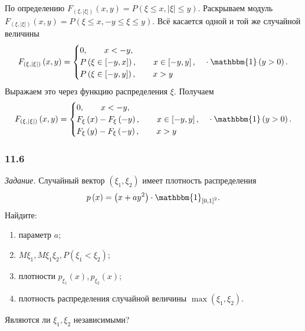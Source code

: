 По определению $F_{ \left( \xi, \left| \xi \right| \right) } \left( x, y \right) = P \left( \xi \leq x, \left| \xi \right| \leq y \right).$
Раскрываем модуль $F_{ \left( \xi, \left| \xi \right| \right) } \left( x, y \right) = P \left( \xi \leq x, -y \leq \xi \leq y \right) $.
Всё касается одной и той же случайной величины
$$F_{ \left( \xi, \left| \xi \right| \right) } \left( x, y \right) =
\begin{cases}
0, \qquad x < - y, \\
P \left( \xi \in \left[ -y, x \right] \right), \qquad x \in \left[ -y, y \right], \\
P \left( \xi \in \left[ -y, y \right] \right), \qquad x > y
\end{cases}
\cdot \mathbbm{1} \left( y > 0 \right).$$
Выражаем это через функцию распределения $ \xi $.
Получаем
$$F_{ \left( \xi, \left| \xi \right| \right) } \left( x, y \right) =
\begin{cases}
0, \qquad x < - y, \\
F_{ \xi } \left( x \right) - F_{ \xi } \left( -y \right), \qquad x \in \left[ -y, y \right], \\
F_{ \xi } \left( y \right) - F_{ \xi } \left( -y \right), \qquad x > y
\end{cases}
\cdot \mathbbm{1} \left( y > 0 \right).$$

\subsubsection*{11.6}

\textit{Задание.}
Случайный вектор $ \left( \xi_1, \xi_2 \right) $ имеет плотность распределения
$$p \left( x \right) =
\left( x+ay^2 \right) \cdot \mathbbm{1}_{ \left[ 0, 1 \right]^2}.$$
Найдите:
\begin{enumerate}[label=\alph*)]
\item параметр $a$;
\item $M \xi_1, M \xi_1 \xi_2, P \left( \xi_1 < \xi_2 \right) $;
\item плотности $p_{ \xi_1} \left( x \right), p_{ \xi_2} \left( x \right) $;
\item плотность распределения случайной величины $ \max \left( \xi_1, \xi_2 \right) $.
\end{enumerate}
Являются ли $ \xi_1, \xi_2$ независимыми?

